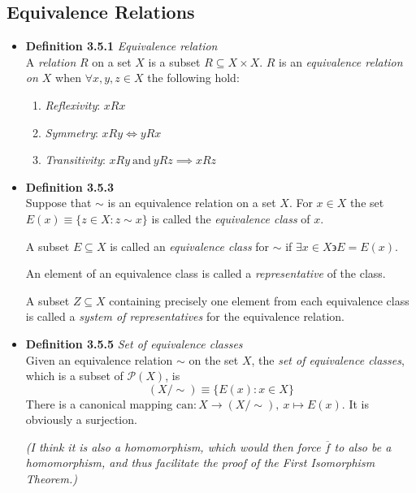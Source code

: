 \documentclass[11pt,a4paper]{article}
\begin{document}
\subsection{Equivalence Relations}

\begin{itemize}

    \item \textbf{Definition 3.5.1} \emph{Equivalence relation} \\
        A \emph{relation} $R$ on a set $X$ is a subset $R \subseteq X \times X$.
        $R$ is an \emph{equivalence relation on $X$} when $\forall x,y,z \in X$
        the following hold:
        \begin{enumerate}
            \item \emph{Reflexivity}: $xRx$
            \item \emph{Symmetry}: $xRy \iff yRx$
            \item \emph{Transitivity}: $xRy \ \text{and} \ yRz \implies xRz$
        \end{enumerate}

    \item \textbf{Definition 3.5.3} \\
        Suppose that $\sim$ is an equivalence relation on a set $X$.
        For $x \in X$ the set $E(x) \equiv \{z \in X : z\sim x\}$ is called the
        \emph{equivalence class} of $x$.

        A subset $E \subseteq X$ is called an \emph{equivalence class} for $\sim$ if
        $\exists x \in X \backepsilon E=E(x)$.

        An element of an equivalence class is called a \emph{representative} of the class.

        A subset $Z \subseteq X$ containing precisely one element from each equivalence
        class is called a \emph{system of representatives} for the equivalence relation.

    \item \textbf{Definition 3.5.5} \emph{Set of equivalence classes} \\
        Given an equivalence relation $\sim$ on the set $X$, the
        \emph{set of equivalence classes}, which is a subset of $\mathcal{P}(X)$, is
        \[
            (X/\sim) \equiv \{E(x) : x \in X\}
        \]
        There is a canonical mapping $\mathrm{can} : X \to (X/\sim), \ x \mapsto E(x)$.
        It is obviously a surjection.

        \emph{(I think it is also a homomorphism,
            which would then force $\overline{f}$ to also be a homomorphism,
        and thus facilitate the proof of the First Isomorphism Theorem.)}


\end{itemize}
\end{document}
